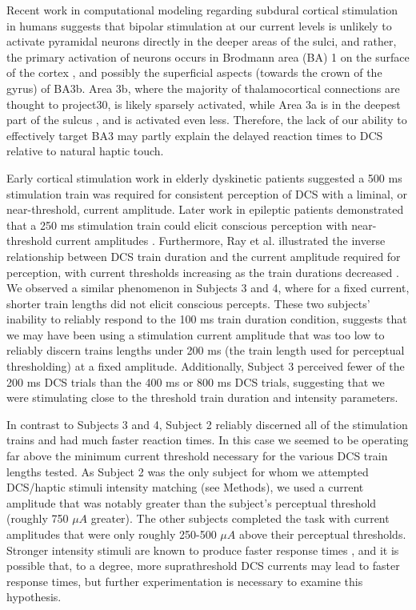 Recent work in computational modeling regarding subdural cortical stimulation in humans suggests that bipolar stimulation at our current levels is unlikely to activate pyramidal neurons directly in the deeper areas of the sulci, and rather, the primary activation of neurons occurs in Brodmann area (BA) 1 on the surface of the cortex \cite{Seo2015,Seo2016}, and possibly the superficial aspects (towards the crown of the gyrus) of BA3b. Area 3b, where the majority of thalamocortical connections are thought to project30, is likely sparsely activated, while Area 3a is in the deepest part of the sulcus \cite{Geyer1999}, and is activated even less. Therefore, the lack of our ability to effectively target BA3 may partly explain the delayed reaction times to DCS relative to natural haptic touch.  

Early cortical stimulation work in elderly dyskinetic patients \cite{LIBET1964} suggested a 500 ms stimulation train was required for consistent perception of DCS with a liminal, or near-threshold, current amplitude. Later work in epileptic patients demonstrated that a 250 ms stimulation train could elicit conscious perception with near-threshold current amplitudes \cite{Ray1999a}. Furthermore, Ray et al. illustrated the inverse relationship between DCS train duration and the current amplitude required for perception, with current thresholds increasing as the train durations decreased \cite{Ray1999a}. We observed a similar phenomenon in Subjects 3 and 4, where for a fixed current, shorter train lengths did not elicit conscious percepts. These two subjects’ inability to reliably respond to the 100 ms train duration condition, suggests that we may have been using a stimulation current amplitude that was too low to reliably discern trains lengths under 200 ms (the train length used for perceptual thresholding) at a fixed amplitude. Additionally, Subject 3 perceived fewer of the 200 ms DCS trials than the 400 ms or 800 ms DCS trials, suggesting that we were stimulating close to the threshold train duration and intensity parameters.

In contrast to Subjects 3 and 4, Subject 2 reliably discerned all of the stimulation trains and had much faster reaction times. In this case we seemed to be operating far above the minimum current threshold necessary for the various DCS train lengths tested. As Subject 2 was the only subject for whom we attempted DCS/haptic stimuli intensity matching (see Methods), we used a current amplitude that was notably greater than the subject’s perceptual threshold (roughly 750 $\mu A$ greater). The other subjects completed the task with current amplitudes that were only roughly 250-500 $\mu A$ above their perceptual thresholds. Stronger intensity stimuli are known to produce faster response times \cite{Woodworth1954a}, and it is possible that, to a degree, more suprathreshold DCS currents may lead to faster response times, but further experimentation is necessary to examine this hypothesis.

